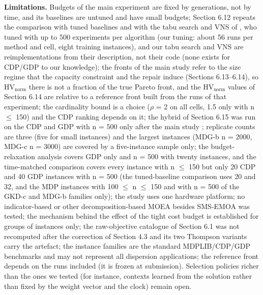 \textbf{Limitations.} Budgets of the main experiment are fixed by generations, not by time, and its baselines are untuned and have small budgets; Section 6.12 repeats the comparison with tuned baselines and with the tabu search and VNS of \citet{colmenar2018}, who tuned with up to 500 experiments per algorithm (our tuning: about 56 runs per method and cell, eight training instances), and our tabu search and VNS are reimplementations from their description, not their code (none exists for CDP/GDP to our knowledge); the fronts of the main study refer to the size regime that the capacity constraint and the repair induce (Sections 6.13--6.14), so $\mathrm{HV}_{\mathrm{norm}}$ there is not a fraction of the true Pareto front, and the $\mathrm{HV}_{\mathrm{norm}}$ values of Section 6.14 are relative to a reference front built from the runs of that experiment; the cardinality bound is a choice ($\rho$ = 2 on all cells, 1.5 only with n $\leq$ 150) and the CDP ranking depends on it; the hybrid of Section 6.15 was run on the CDP and GDP with n = 500 only after the main study ; replicate counts are three (five for small instances) and the largest instances (MDG-b n = 2000, MDG-c n = 3000) are covered by a five-instance sample only; the budget-relaxation analysis covers GDP only and n = 500 with twenty instances, and the time-matched comparison covers every instance with n $\leq$ 150 but only 20 CDP and 40 GDP instances with n = 500 (the tuned-baseline comparison uses 20 and 32, and the MDP instances with 100 $\leq$ n $\leq$ 150 and with n = 500 of the GKD-c and MDG-b families only); the study uses one hardware platform; no indicator-based or other decomposition-based MOEA besides SMS-EMOA was tested; the mechanism behind the effect of the tight cost budget is established for groups of instances only; the raw-objective catalogue of Section 6.1 was not recomputed after the correction of Section 4.3 and its two Thompson variants carry the artefact; the instance families are the standard MDPLIB/CDP/GDP benchmarks and may not represent all dispersion applications; the reference front depends on the runs included (it is frozen at submission). Selection policies richer than the ones we tested (for instance, contexts learned from the solution rather than fixed by the weight vector and the clock) remain open.
